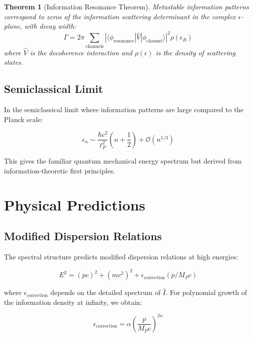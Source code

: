 \documentclass[12pt]{article}
\newtheorem{theorem}{Theorem}[section]
\begin{document}
\begin{theorem}[Information Resonance Theorem]
Metastable information patterns correspond to zeros of the information scattering determinant in the complex $\epsilon$-plane, with decay width:
\begin{equation}
\Gamma = 2\pi \sum_{\text{channels}} |\langle \phi_{\text{resonance}} | \hat{V} | \phi_{\text{channel}} \rangle|^2 \rho(\epsilon_R)
\end{equation}
where $\hat{V}$ is the decoherence interaction and $\rho(\epsilon)$ is the density of scattering states.
\end{theorem}

\subsection{Semiclassical Limit}

In the semiclassical limit where information patterns are large compared to the Planck scale:

\begin{equation}
\epsilon_n \sim \frac{\hbar c^2}{\ell_P^2} \left(n + \frac{1}{2}\right) + \mathcal{O}(n^{1/3})
\end{equation}

This gives the familiar quantum mechanical energy spectrum but derived from information-theoretic first principles.

\section{Physical Predictions}

\subsection{Modified Dispersion Relations}

The spectral structure predicts modified dispersion relations at high energies:

\begin{equation}
E^2 = (pc)^2 + (mc^2)^2 + \epsilon_{\text{correction}}(p/M_P c)
\end{equation}

where $\epsilon_{\text{correction}}$ depends on the detailed spectrum of $\hat{I}$. For polynomial growth of the information density at infinity, we obtain:

\begin{equation}
\epsilon_{\text{correction}} = \alpha \left(\frac{p}{M_P c}\right)^{2n}
\end{equation}
\end{document}
